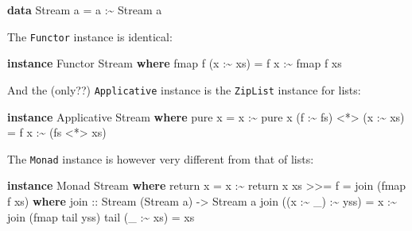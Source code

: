 \documentclass[]{article}
\newenvironment{Shaded}{}{}
\newcommand{\DataTypeTok}[1]{\textcolor[rgb]{0.56,0.13,0.00}{#1}}
\newcommand{\FunctionTok}[1]{\textcolor[rgb]{0.02,0.16,0.49}{#1}}
\newcommand{\KeywordTok}[1]{\textcolor[rgb]{0.00,0.44,0.13}{\textbf{#1}}}
\newcommand{\NormalTok}[1]{#1}
\newcommand{\OperatorTok}[1]{\textcolor[rgb]{0.40,0.40,0.40}{#1}}
\newcommand{\OtherTok}[1]{\textcolor[rgb]{0.00,0.44,0.13}{#1}}
\begin{document}
\begin{Shaded}
\begin{Highlighting}[]
\KeywordTok{data} \DataTypeTok{Stream}\NormalTok{ a }\OtherTok{=}\NormalTok{ a }\OperatorTok{:\textasciitilde{}} \DataTypeTok{Stream}\NormalTok{ a}
\end{Highlighting}
\end{Shaded}

The \texttt{Functor} instance is identical:

\begin{Shaded}
\begin{Highlighting}[]
\KeywordTok{instance} \DataTypeTok{Functor} \DataTypeTok{Stream} \KeywordTok{where}
    \FunctionTok{fmap}\NormalTok{ f (x }\OperatorTok{:\textasciitilde{}}\NormalTok{ xs) }\OtherTok{=}\NormalTok{ f x }\OperatorTok{:\textasciitilde{}} \FunctionTok{fmap}\NormalTok{ f xs}
\end{Highlighting}
\end{Shaded}

And the (only??) \texttt{Applicative} instance is the \texttt{ZipList} instance
for lists:

\begin{Shaded}
\begin{Highlighting}[]
\KeywordTok{instance} \DataTypeTok{Applicative} \DataTypeTok{Stream} \KeywordTok{where}
    \FunctionTok{pure}\NormalTok{ x }\OtherTok{=}\NormalTok{ x }\OperatorTok{:\textasciitilde{}} \FunctionTok{pure}\NormalTok{ x}
\NormalTok{    (f }\OperatorTok{:\textasciitilde{}}\NormalTok{ fs) }\OperatorTok{<*>}\NormalTok{ (x }\OperatorTok{:\textasciitilde{}}\NormalTok{ xs) }\OtherTok{=}\NormalTok{ f x }\OperatorTok{:\textasciitilde{}}\NormalTok{ (fs }\OperatorTok{<*>}\NormalTok{ xs)}
\end{Highlighting}
\end{Shaded}

The \texttt{Monad} instance is however very different from that of lists:

\begin{Shaded}
\begin{Highlighting}[]
\KeywordTok{instance} \DataTypeTok{Monad} \DataTypeTok{Stream} \KeywordTok{where}
    \FunctionTok{return}\NormalTok{ x }\OtherTok{=}\NormalTok{ x }\OperatorTok{:\textasciitilde{}} \FunctionTok{return}\NormalTok{ x}
\NormalTok{    xs }\OperatorTok{>>=}\NormalTok{ f }\OtherTok{=}\NormalTok{ join\textquotesingle{} (}\FunctionTok{fmap}\NormalTok{ f xs)}
      \KeywordTok{where}
\OtherTok{        join\textquotesingle{} ::} \DataTypeTok{Stream}\NormalTok{ (}\DataTypeTok{Stream}\NormalTok{ a) }\OtherTok{{-}>} \DataTypeTok{Stream}\NormalTok{ a}
\NormalTok{        join\textquotesingle{} ((x }\OperatorTok{:\textasciitilde{}}\NormalTok{ \_) }\OperatorTok{:\textasciitilde{}}\NormalTok{ yss) }\OtherTok{=}\NormalTok{ x }\OperatorTok{:\textasciitilde{}}\NormalTok{ join\textquotesingle{} (}\FunctionTok{fmap}\NormalTok{ tail\textquotesingle{} yss)}
\NormalTok{        tail\textquotesingle{} (\_ }\OperatorTok{:\textasciitilde{}}\NormalTok{ xs) }\OtherTok{=}\NormalTok{ xs}
\end{Highlighting}
\end{Shaded}
\end{document}
